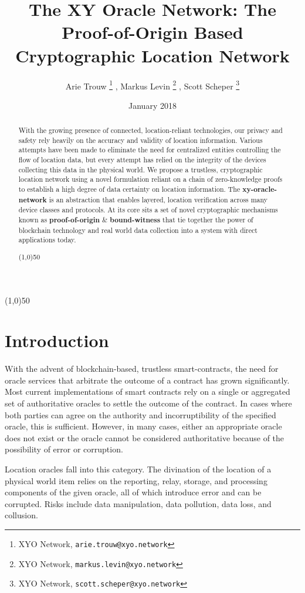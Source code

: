 \documentclass{article}
\title {The XY Oracle Network: The Proof-of-Origin Based Cryptographic Location Network}
\author{
    Arie Trouw
        \thanks{XYO Network, \texttt{arie.trouw@xyo.network}}
    , Markus Levin
        \thanks{XYO Network, \texttt{markus.levin@xyo.network}}
    , Scott Scheper
        \thanks{XYO Network, \texttt{scott.scheper@xyo.network}}
}
\date{January 2018}
\begin{document}
\maketitle

\begin{center}
\line(1,0){50}
\end{center}

\begin{abstract}
With the growing presence of connected, location-reliant technologies, our privacy and safety rely heavily on the \gls{accuracy} and validity of location information. Various attempts have been made to eliminate the need for centralized entities controlling the flow of location data, but every attempt has relied on the integrity of the devices collecting this data in the physical world. We propose a \gls{trustless}, cryptographic location network using a novel formulation reliant on a chain of zero-knowledge proofs to establish a high degree of data \gls{certainty} on location information. The \textbf{\Gls{xy-oracle-network}} is an abstraction that enables layered, location verification across many device classes and protocols. At its core sits a set of novel cryptographic mechanisms known as \textbf{\Gls{proof-of-origin}} \& \textbf{\Gls{bound-witness}} that tie together the power of blockchain technology and real world data collection into a system with direct applications today.

\begin{center}
\line(1,0){50}
\end{center}
\end{abstract}

\section{Introduction}
With the advent of blockchain-based, \gls{trustless} \glspl{smart-contract}, the need for \gls{oracle} services that arbitrate the outcome of a contract has grown significantly. Most current implementations of smart contracts rely on a single or aggregated set of authoritative oracles to settle the outcome of the contract. In cases where both parties can agree on the authority and incorruptibility of the specified oracle, this is sufficient. However, in many cases, either an appropriate oracle does not exist or the oracle cannot be considered authoritative because of the possibility of error or corruption.

Location oracles fall into this category. The divination of the location of a physical world item relies on the reporting, relay, storage, and processing components of the given oracle, all of which introduce error and can be corrupted. Risks include data manipulation, data pollution, data loss, and collusion.
\end{document}
